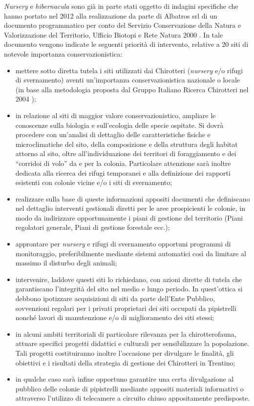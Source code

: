 \documentclass[10pt,twoside,openany,x11names,svgnames,italian,a5paper,dvipsnames,table]{memoir}
\begin{document}
\emph{Nursery} e \emph{hibernacula} sono già in parte stati oggetto di indagini specifiche che hanno portato nel 2012 alla realizzazione da parte di Albatros srl di un documento programmatico per conto del Servizio Conservazione della Natura e Valorizzazione del Territorio, Ufficio Biotopi e Rete Natura 2000 \cite{Torboli12}. In tale documento vengono indicate le seguenti priorità di intervento, relative a 20 siti di notevole importanza conservazionistica:
\begin{itemize}\itemsep0pt
  \item mettere sotto diretta tutela i siti utilizzati dai Chirotteri (\emph{nursery} e/o rifugi di svernamento) aventi un’importanza conservazionistica nazionale o locale (in base alla metodologia proposta dal Gruppo Italiano Ricerca Chirotteri nel 2004 \cite{GIRC04});
  \item in relazione al siti di maggior valore conservazionistico, ampliare le conoscenze sulla biologia e sull’ecologia delle specie ospitate. Si dovrà procedere con un’analisi di dettaglio delle caratteristiche fisiche e microclimatiche del sito, della composizione e della struttura degli habitat attorno al sito, oltre all’individuazione dei territori di foraggiamento e dei “corridoi di volo” da e per la colonia. Particolare attenzione sarà inoltre dedicata alla ricerca dei rifugi temporanei e alla definizione dei rapporti esistenti con colonie vicine e/o i siti di svernamento;
  \item realizzare sulla base di queste informazioni appositi documenti che definiscano nel dettaglio interventi gestionali diretti per le aree prospicienti le colonie, in modo da indirizzare opportunamente i piani di gestione del territorio (Piani regolatori generale, Piani di gestione forestale ecc.);
  \item approntare per \emph{nursery} e rifugi di svernamento opportuni programmi di monitoraggio, preferibilmente mediante sistemi automatici così da limitare al massimo il disturbo degli animali;
  \item intervenire, laddove questi siti lo richiedano, con azioni dirette di tutela che garantiscano l’integrità del sito nel medio e lungo periodo. In quest’ottica si debbono ipotizzare acquisizioni di siti da parte dell’Ente Pubblico, sovvenzioni regolari per i privati proprietari dei siti occupati da pipistrelli nonché lavori di manutenzione e/o di miglioramento dei siti stessi;
  \item in alcuni ambiti territoriali di particolare rilevanza per la chirotterofauna, attuare specifici progetti didattici e culturali per sensibilizzare la popolazione. Tali progetti costituiranno inoltre l’occasione per divulgare le finalità, gli obiettivi e i risultati della strategia di gestione dei Chirotteri in Trentino;
  \item in qualche caso sarà infine opportuno garantire una certa divulgazione al pubblico delle colonie di pipistrelli mediante appositi materiali informativi o attraverso l’utilizzo di telecamere a circuito chiuso appositamente predisposte.
\end{itemize}
\end{document}
